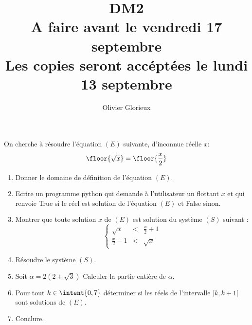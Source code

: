 \documentclass[a4paper, 11pt,reqno]{article}
\author{Olivier Glorieux}
\begin{document}
\title{DM2 \\
\small{A faire avant le vendredi 17 septembre\\
Les copies seront accéptées le lundi 13 septembre
} 
}





\begin{exercice}
On cherche à résoudre l'équation $(E)$ suivante, d'inconnue réelle $x$: 
$$\floor{\sqrt{x}} = \floor{ \frac{x}{2}}$$
\begin{enumerate}
\item Donner le domaine de définition de  l'équation $(E)$. 
\item Ecrire un programme python qui demande à l'utilisateur un flottant $x$ et qui renvoie True si le réel est solution de l'équation $(E)$  et False sinon. 
\item Montrer que toute solution $x$  de $(E)$ est solution du système $(S)$ suivant : 
$$\left\{ 
\begin{array}{ccc}
\sqrt{x}&<& \frac{x}{2}+1\\
\frac{x}{2}-1&<& \sqrt{x}
\end{array}
\right. $$
\item Résoudre le système $(S)$. 
\item Soit $\alpha = 2(2+\sqrt{3})$ Calculer la partie entière de $\alpha$. 
\item Pour tout $k\in \intent{0,7} $ déterminer si les réels de l'intervalle $[k,k+1[$ sont solutions de $(E)$. 
\item Conclure.  
\end{enumerate}
\end{exercice}
\end{document}
